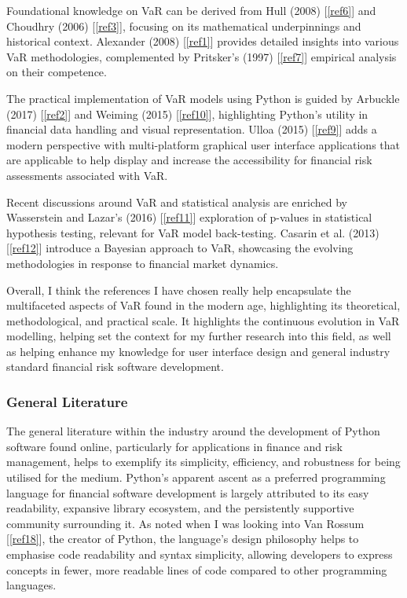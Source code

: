 \documentclass{article}
\begin{document}
Foundational knowledge on VaR can be derived from Hull (2008) [\ref{ref6}] and Choudhry (2006) [\ref{ref3}], focusing on its mathematical underpinnings and historical context. Alexander (2008) [\ref{ref1}] provides detailed insights into various VaR methodologies, complemented by Pritsker's (1997) [\ref{ref7}] empirical analysis on their competence.\\\vspace{0.3cm}

The practical implementation of VaR models using Python is guided by Arbuckle (2017) [\ref{ref2}] and Weiming (2015) [\ref{ref10}], highlighting Python's utility in financial data handling and visual representation. Ulloa (2015) [\ref{ref9}]  adds a modern perspective with multi-platform graphical user interface applications that are applicable to help display and increase the accessibility for financial risk assessments associated with VaR.\\\vspace{0.3cm}

Recent discussions around VaR and statistical analysis are enriched by Wasserstein and Lazar's (2016) [\ref{ref11}] exploration of p-values in statistical hypothesis testing, relevant for VaR model back-testing. Casarin et al. (2013) [\ref{ref12}] introduce a Bayesian approach to VaR, showcasing the evolving methodologies in response to financial market dynamics.\\\vspace{0.3cm}

Overall, I think the references I have chosen really help encapsulate the multifaceted aspects of VaR found in the modern age, highlighting its theoretical, methodological, and practical scale. It highlights the continuous evolution in VaR modelling, helping set the context for my further research into this field, as well as helping enhance my knowledge for user interface design and general industry standard financial risk software development.

\subsubsection{General Literature}

The general literature within the industry around the development of Python software found online, particularly for applications in finance and risk management, helps to exemplify its simplicity, efficiency, and robustness for being utilised for the medium. Python's apparent ascent as a preferred programming language for financial software development is largely attributed to its easy readability, expansive library ecosystem, and the persistently supportive community surrounding it. As noted when I was looking into Van Rossum [\ref{ref18}], the creator of Python, the language's design philosophy helps to emphasise code readability and syntax simplicity, allowing developers to express concepts in fewer, more readable lines of code compared to other programming languages.\\\vspace{0.3cm}
\end{document}
